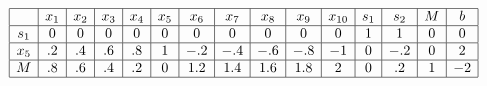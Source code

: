 \documentclass{article}
\begin{document}
\begin{equation}
    \begin{array}{|c|c|c|c|c|c|c|c|c|c|c|c|c|c|c|}
        \hline
        & x_1 & x_2 & x_3 & x_4 & x_5 & x_6 & x_7 & x_8 & x_9 & x_{10} & s_1 & s_2 & M & b \\
        \hline
        s_1 & 0 & 0 & 0 & 0 & 0 & 0 & 0 & 0 & 0 & 0& 1 & 1 & 0 & 0 \\
        \hline
        x_5 & .2 & .4 & .6 & .8 & 1 & -.2 & -.4 & -.6 & -.8 & -1 & 0 & -.2 & 0 & 2 \\
        \hline
        M & .8 & .6 & .4 & .2 & 0 & 1.2 & 1.4 & 1.6 & 1.8 & 2 & 0 & .2 & 1 & -2 \\
        \hline
    \end{array}
\end{equation}
\end{document}
